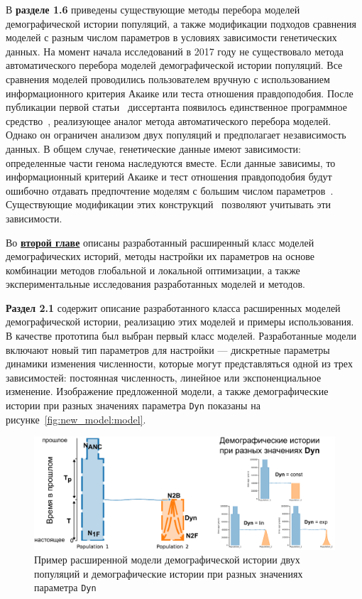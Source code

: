 В \textbf{разделе 1.6} приведены существующие методы перебора моделей демографической истории популяций, а также модификации подходов сравнения моделей с разным числом параметров в условиях зависимости генетических данных.
На момент начала исследований в 2017 году не существовало метода автоматического перебора моделей демографической истории популяций.
Все сравнения моделей проводились пользователем вручную с использованием информационного критерия Акаике или теста отношения правдоподобия.
После публикации первой статьи~\cite{noskova2020gadma} диссертанта появилось единственное программное средство~\cite{rippe2021environmental}, реализующее аналог метода автоматического перебора моделей.
Однако он ограничен анализом двух популяций и предполагает независимость данных.
В общем случае, генетические данные имеют зависимости: определенные части генома наследуются вместе.
Если данные зависимы, то информационный критерий Акаике и тест отношения правдоподобия будут ошибочно отдавать предпочтение моделям с большим числом параметров~\cite{gao2010composite}.
Существующие модификации этих конструкций~\cite{coffman2016computationally} позволяют учитывать эти зависимости.



Во \underline{\textbf{второй главе}} описаны разработанный расширенный класс моделей демографических историй, методы настройки их параметров на основе комбинации методов глобальной и локальной оптимизации, а также экспериментальные исследования разработанных моделей и методов.

\textbf{Раздел 2.1} содержит описание разработанного класса расширенных моделей демографической истории, реализацию этих моделей и примеры использования.
В качестве прототипа был выбран первый класс моделей.
Разработанные модели включают новый тип параметров для настройки --- дискретные параметры динамики изменения численности, которые могут представляться одной из трех зависимостей: постоянная численность, линейное или экспоненциальное изменение.
Изображение предложенной модели, а также демографические истории при разных значениях параметра \texttt{Dyn} показаны на рисунке~\ref{fig:new_model:model}.

\begin{figure}[ht]
    \centering
    \includegraphics[width=\linewidth]{images_2/picture_2pops_model_3.pdf}
    \caption{Пример расширенной модели демографической истории двух популяций и демографические истории при разных значениях параметра \texttt{Dyn}}
\end{figure}



